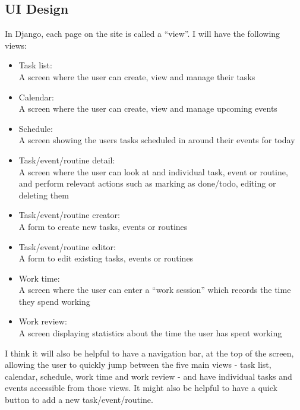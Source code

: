 \documentclass{article}
\begin{document}
\subsection{UI Design}
In Django,
each page on the site is called a ``view''.
I will have the following views:
\begin{itemize}
\item Task list:\\
  A screen where the user can create, view and manage their tasks
\item Calendar:\\
  A screen where the user can create, view and manage upcoming events
\item Schedule:\\
  A screen showing the users tasks scheduled in around their events for today
\item Task/event/routine detail:\\
  A screen where the user can look at and individual task, event or routine,
  and perform relevant actions such as marking as done/todo,
  editing or deleting them
\item Task/event/routine creator:\\
  A form to create new tasks, events or routines
\item Task/event/routine editor:\\
  A form to edit existing tasks, events or routines
\item Work time:\\
  A screen where the user can enter a ``work session'' which records the time they spend working
\item Work review:\\
  A screen displaying statistics about the time the user has spent working
\end{itemize}

I think it will also be helpful to have a navigation bar,
at the top of the screen,
allowing the user to quickly jump between the five main views -
task list, calendar, schedule, work time and work review -
and have individual tasks and events accessible from those views.
It might also be helpful to have a quick button to add a new task/event/routine.
\end{document}
